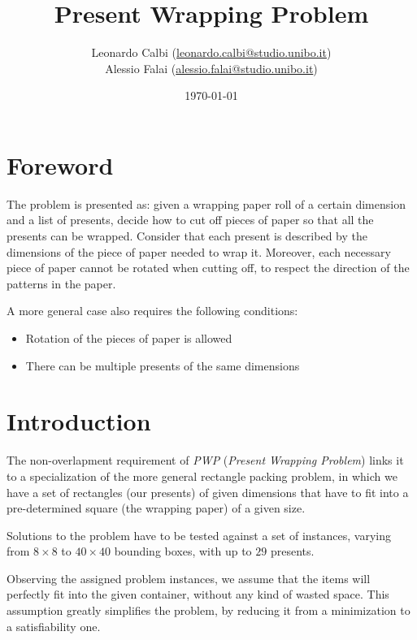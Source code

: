 \documentclass[a4paper,10pt]{article}
\begin{document}
\title{Present Wrapping Problem}
\author{Leonardo Calbi (\href{mailto:leonardo.calbi@studio.unibo.it}{leonardo.calbi@studio.unibo.it}) \\ Alessio Falai (\href{mailto:alessio.falai@studio.unibo.it}{alessio.falai@studio.unibo.it})}
\date{\today}
\maketitle
\tableofcontents
\newpage
\listoffigures
\newpage

\section*{Foreword}
The problem is presented as: given a wrapping paper roll of a certain dimension and a list of presents, decide how to cut off pieces of paper so  that all the presents can be wrapped.
Consider that each present is described by the dimensions of the piece of paper needed to wrap it. Moreover, each necessary piece of paper cannot be rotated when cutting off, to respect the direction of the patterns in the paper.

A more general case also requires the following conditions:
\begin{itemize}
   \item Rotation of the pieces of paper is allowed
   \item There can be multiple presents of the same dimensions
\end{itemize}

\section{Introduction}
The non-overlapment requirement of \textit{PWP} (\textit{Present Wrapping Problem}) links it to a specialization of the more general rectangle packing problem, in which we have a set of rectangles (our presents) of given dimensions that have to fit into a pre-determined square (the wrapping paper) of a given size.

Solutions to the problem have to be tested against a set of instances, varying from $8\times 8$ to $40\times 40$ bounding boxes, with up to $29$ presents.

Observing the assigned problem instances, we assume that the items will perfectly fit into the given container, without any kind of wasted space. This assumption greatly simplifies the problem, by reducing it from a minimization to a satisfiability one.
\end{document}
